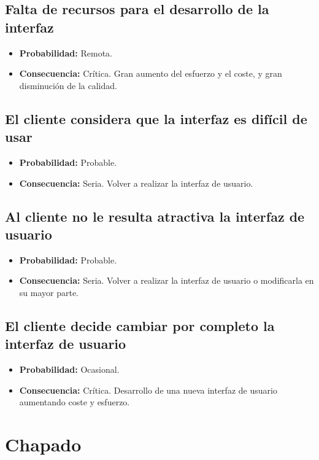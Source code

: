 \documentclass[spanish,a4paper,12pt]{report}	%
\begin{document}
	\subsection*{Falta de recursos para el desarrollo de la interfaz}
		\begin{itemize}
			\item \textbf {Probabilidad: }Remota.
			\item \textbf {Consecuencia: }Crítica. Gran aumento del esfuerzo y el coste, y gran disminución de la calidad.
		\end{itemize}
	
	\subsection*{El cliente considera que la interfaz es difícil de usar}
		\begin{itemize}
			\item \textbf {Probabilidad: }Probable.
			\item \textbf {Consecuencia: }Seria. Volver a realizar la interfaz de usuario.
		\end{itemize}
	
	\subsection*{Al cliente no le resulta atractiva la interfaz de usuario}
		\begin{itemize}
			\item \textbf {Probabilidad: }Probable.
			\item \textbf {Consecuencia: }Seria. Volver a realizar la interfaz de usuario o modificarla en su mayor parte.
		\end{itemize}
	
	\subsection*{El cliente decide cambiar por completo la interfaz de usuario}
		\begin{itemize}
			\item \textbf {Probabilidad: }Ocasional.
			\item \textbf {Consecuencia: }Crítica. Desarrollo de una nueva interfaz de usuario aumentando coste y esfuerzo.
		\end{itemize}

%
\section{Chapado}
\end{document}
